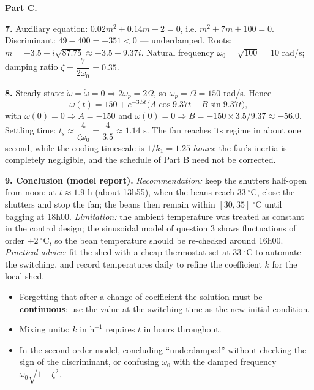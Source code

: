 \documentclass[11pt]{article}
\begin{document}
\textbf{Part C.}

\textbf{7.} Auxiliary equation: $0.02m^2+0.14m+2=0$, i.e. $m^2+7m+100=0$. Discriminant: $49-400=-351<0$ — underdamped. Roots: $m=-3.5\pm i\sqrt{87.75}\approx-3.5\pm9.37i$. Natural frequency $\omega_0=\sqrt{100}=10$ rad/s; damping ratio $\zeta=\dfrac{7}{2\omega_0}=0.35$.

\textbf{8.} Steady state: $\ddot\omega=\dot\omega=0\Rightarrow 2\omega_p=2\Omega$, so $\omega_p=\Omega=150$ rad/s. Hence
\[
\omega(t)=150+e^{-3.5t}\bigl(A\cos 9.37t+B\sin 9.37t\bigr),
\]
with $\omega(0)=0\Rightarrow A=-150$ and $\dot\omega(0)=0\Rightarrow B=-150\times3.5/9.37\approx-56.0$. Settling time: $t_s\approx\dfrac{4}{\zeta\omega_0}=\dfrac{4}{3.5}\approx1.14$ s. The fan reaches its regime in about one second, while the cooling timescale is $1/k_1=1.25$ \emph{hours}: the fan's inertia is completely negligible, and the schedule of Part B need not be corrected.

\textbf{9. Conclusion (model report).} \emph{Recommendation:} keep the shutters half-open from noon; at $t\approx1.9$ h (about 13h55), when the beans reach $33\ ^{\circ}\mathrm{C}$, close the shutters and stop the fan; the beans then remain within $[30,35]\ ^{\circ}\mathrm{C}$ until bagging at 18h00. \emph{Limitation:} the ambient temperature was treated as constant in the control design; the sinusoidal model of question 3 shows fluctuations of order $\pm2\ ^{\circ}\mathrm{C}$, so the bean temperature should be re-checked around 16h00. \emph{Practical advice:} fit the shed with a cheap thermostat set at $33\ ^{\circ}\mathrm{C}$ to automate the switching, and record temperatures daily to refine the coefficient $k$ for the local shed.

\begin{attention}
\begin{itemize}
\item Forgetting that after a change of coefficient the solution must be \textbf{continuous}: use the value at the switching time as the new initial condition.
\item Mixing units: $k$ in $\mathrm{h}^{-1}$ requires $t$ in hours throughout.
\item In the second-order model, concluding ``underdamped'' without checking the sign of the discriminant, or confusing $\omega_0$ with the damped frequency $\omega_0\sqrt{1-\zeta^2}$.
\end{itemize}
\end{attention}
\end{document}
